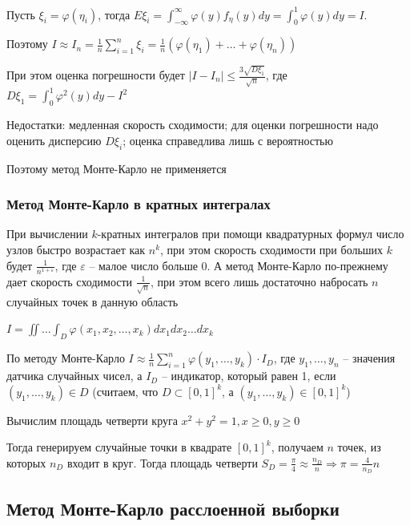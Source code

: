 \begin{enumerate}[label*=\Roman*. ]
    Пусть $\xi_i = \varphi(\eta_i)$, тогда $E\xi_i = \int_{-\infty}^{\infty} \varphi(y) f_\eta (y) dy = \int_0^1 \varphi(y) dy = I$. 
    
    Поэтому $I \approx I_n = \frac{1}{n} \sum_{i = 1}^n \xi_i = \frac{1}{n} (\varphi(\eta_1) + \dots + \varphi(\eta_n))$

    При этом оценка погрешности будет $|I - I_n| \leq \frac{3\sqrt{D \xi_1}}{\sqrt{n}}$, где $D \xi_1 = \int_0^1 \varphi^2(y) dy - I^2$

    Недостатки: медленная скорость сходимости; для оценки погрешности надо оценить дисперсию $D\xi_i$; оценка справедлива лишь с вероятностью

    Поэтому метод Монте-Карло не применяется

\end{enumerate}

\subsubsection{Метод Монте-Карло в кратных интегралах}

\hypertarget{monte_carlo_k_integral}{}

\Nota При вычислении $k$-кратных интегралов при помощи квадратурных формул число узлов быстро возрастает как $n^k$, при этом скорость сходимости при больших $k$ будет $\frac{1}{n^{1 + \varepsilon}}$, где $\varepsilon$ -- малое число больше 0. А метод Монте-Карло по-прежнему дает скорость сходимости $\frac{1}{\sqrt{n}}$, при этом всего лишь достаточно набросать $n$ случайных точек в данную область

$I = \iint \dots \int_D \varphi(x_1, x_2, \dots, x_k) dx_1 dx_2 \dots dx_k$

По методу Монте-Карло $I \approx \frac{1}{n} \sum_{i = 1}^n \varphi(y_1, \dots, y_k) \cdot I_D$, где $y_1, \dots, y_n$ -- значения датчика случайных чисел, а $I_D$ -- индикатор, который равен 1, если $(y_1, \dots, y_k) \in D$ (считаем, что $D \subset [0, 1]^k$, а $(y_1, \dots, y_k) \in [0, 1]^k$) 

\Ex Вычислим площадь четверти круга $x^2 + y^2 = 1, x \geq 0, y \geq 0$

Тогда генерируем случайные точки в квадрате $[0, 1]^k$, получаем $n$ точек, из которых $n_D$ входит в круг. Тогда площадь четверти $S_D = \frac{\pi}{4} \approx \frac{n_D}{n} \Longrightarrow \pi = \frac{4}{n_D}{n}$

\subsection{Метод Монте-Карло расслоенной выборки}

